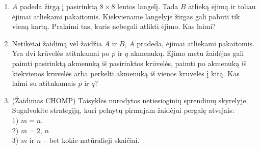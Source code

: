 \begin{enumerate}
%
%

\item $A$ padeda žirgą  į pasirinktą  $8\times 8$ lentos langelį. Tada $B$
  atlieką ėjimą ir toliau ėjimai atliekami pakaitomis. Kiekviename
  langelyje žirgas gali pabūti tik vieną kartą. Pralaimi tas, kuris
  nebegali atlikti ėjimo. Kas laimi?


\item Netikėtai žaidimą vėl žaidžia $A$ ir $B$, $A$ pradeda, ėjimai atliekami pakaitomis. Yra dvi krūvelės atitnkamai po $p$ ir $q$ akmenukų. Ėjimo metu žaidėjas gali paimti pasirinktą akmenuką iš pasirinktos krūvelės, paimti po akmenuką iš kiekvienos krūvelės arba perkelti akmenuką iš vienos krūvelės į kitą. Kas laimi su atitnkamais $p$ ir $q$?


\item(Žaidimas CHOMP)
  Taisyklės nurodytos netiesioginių sprendimų skyrelyje. Sugalvokite
  strategiją, kuri pelnytų pirmajam žaidėjui pergalę atvejais: \\
  1) $m=n$. \\
  2) $m=2$, $n$ \\ %
  3) $m$ ir $n$ – bet kokie natūralieji skaičiai.


\end{enumerate}
